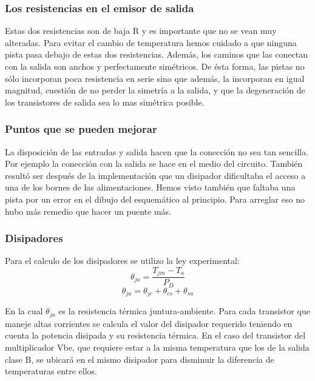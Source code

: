 \subsubsection*{Los resistencias en el emisor de salida}
Estas dos resistencias son de baja R y es importante que no se vean muy alteradas. Para evitar el cambio de temperatura hemos cuidado a que ninguna pista pasa debajo de estas dos resistencias. Además, los caminos que las conectan con la salida son anchos y perfectamente simétricos. De ésta forma, las pistas no sólo incorporan poca resistencia en serie sino que además, la incorporan en igual magnitud, cuestión de no perder la simetría a la salida, y que la degeneración de los transistores de salida sea lo mas simétrica posible.


\subsubsection*{Puntos que se pueden mejorar}
La disposición de las entradas y salida hacen que la conección no sea tan sencilla. Por ejemplo la conección con la salida se hace en el medio del circuito. También resultó ser después de la implementación que un disipador dificultaba el acceso a una de los bornes de las alimentaciones. 
Hemos visto también que faltaba una pista por un error en el dibujo del esquemático al principio. Para arreglar eso no hubo más remedio que hacer un puente más.

\subsubsection{Disipadores}
\bigskip
Para el calculo de los disipadores se utilizo la ley experimental:
$$
   \theta_{ja}=\dfrac{T_{jm}-T_a}{P_D}
$$
$$
	\theta_{ja}=\theta_{jc}+\theta_{cs}+\theta_{sa}
$$

En la cual $\theta_{ja}$ es la resistencia térmica juntura-ambiente. Para cada transistor que maneje altas corrientes se calcula el valor del disipador requerido teniendo en cuenta la potencia disipada y su resistencia térmica. En el caso del transistor del multiplicador Vbe, que requiere estar a la misma temperatura que los de la salida clase B, se ubicará en el mismo disipador para disminuir la diferencia de temperaturas entre ellos.

